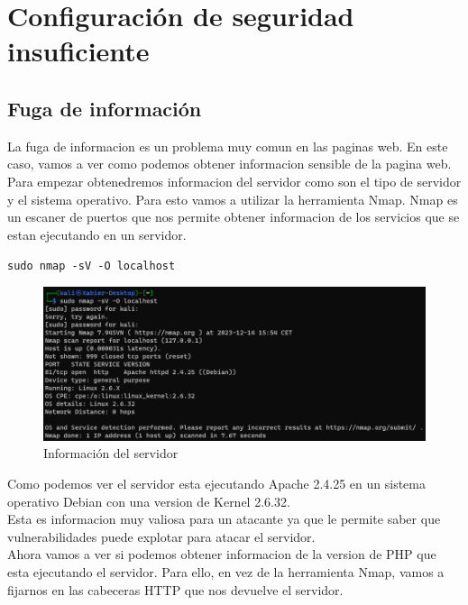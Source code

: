 \documentclass{report}
\begin{document}
        \section{Configuración de seguridad insuficiente}
            \subsection{Fuga de información}
                La fuga de informacion es un problema muy comun en las paginas web.
                En este caso, vamos a ver como podemos obtener informacion sensible de la pagina web.\\

                Para empezar obtenedremos informacion del servidor como son el tipo de servidor y el sistema operativo.
                Para esto vamos a utilizar la herramienta Nmap.
                Nmap es un escaner de puertos que nos permite obtener informacion de los servicios que se estan ejecutando en un servidor.
                \begin{center}
                    \texttt{sudo nmap -sV -O localhost}
                \end{center}
                \begin{figure}[H]
                    \centering
                    \includegraphics[width=1\textwidth]{./img/vulnerabilidades/2.4/1.1.png}
                    \caption{Información del servidor}
                \end{figure}
                Como podemos ver el servidor esta ejecutando Apache 2.4.25 en un sistema operativo Debian con una version de Kernel 2.6.32.\\
                Esta es informacion muy valiosa para un atacante ya que le permite saber que vulnerabilidades puede explotar para atacar el servidor.\\
                \clearpage
                Ahora vamos a ver si podemos obtener informacion de la version de PHP que esta ejecutando el servidor.
                Para ello, en vez de la herramienta Nmap, vamos a fijarnos en las cabeceras HTTP que nos devuelve el servidor.
\end{document}
